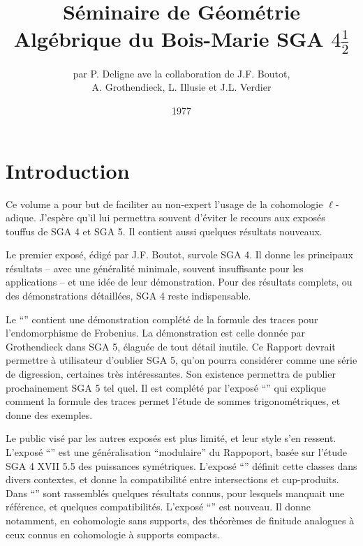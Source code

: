 \documentclass{book}
\title{Séminaire de Géométrie Algébrique du Bois-Marie SGA $4\frac 1 2$}
\author{par P. Deligne ave la collaboration de J.F. Boutot, \\ A. Grothendieck, L. Illusie et J.L. Verdier}
\date{1977}
\begin{document}
\maketitle












\chapter*{Introduction}

Ce volume a pour but de faciliter au non-expert l'usage de la 
cohomologie $\ell$-adique. J'espère qu'il lui permettra souvent d'éviter le 
recours aux exposés touffus de SGA 4 et SGA 5. Il contient aussi quelques 
résultats nouveaux. 

Le premier exposé, édigé par J.F. Boutot, survole SGA 4. Il donne les 
principaux résultats -- avec une généralité minimale, souvent 
insuffisante pour les applications -- et une idée de leur démonstration. Pour 
des résultats complets, ou des démonstrations détaillées, SGA 4 reste 
indispensable. 

Le ``'' contient une démonstration complété de 
la formule des traces pour l'endomorphisme de Frobenius. La démonstration est 
celle donnée par Grothendieck dans SGA 5, élaguée de tout détail inutile. Ce 
Rapport devrait permettre à utilisateur d'oublier SGA 5, qu'on pourra 
considérer comme une série de digression, certaines très intéressantes. Son 
existence permettra de publier prochainement SGA 5 tel quel. Il est complété 
par l'exposé ``'' qui explique comment la formule des traces permet 
l'étude de sommes trigonométriques, et donne des exemples. 

Le public visé par les autres exposés est plus limité, et leur style s'en 
ressent. L'exposé ``'' est une 
généralisation ``modulaire'' du Rappoport, basée sur l'étude SGA 4 XVII 5.5 des 
puissances symétriques. L'exposé ``'' 
définit cette classes dans divers contextes, et donne la compatibilité 
entre intersections et cup-produits. Dans ``'' sont rassemblés 
quelques résultats connus, pour lesquels manquait une référence, et quelques 
compatibilités. L'exposé ``'' 
est nouveau. Il donne notamment, en cohomologie sans supports, des théorèmes de 
finitude analogues à ceux connus en cohomologie à supports compacts. 
\end{document}
